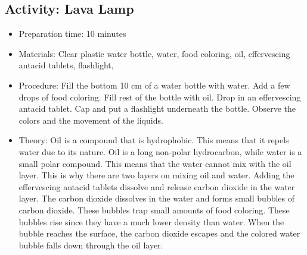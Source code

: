 \begin{itemize}
{\begin{itemize}
\begin{itemize}
{\subsection{Activity: Lava Lamp}
\begin{itemize}
\item{Preparation time: 10 minutes}
\item{Materials: Clear plastic water bottle, water, food coloring, oil, effervescing antacid tablets, flashlight,}
\item{Procedure: Fill the bottom 10 cm of a water bottle with water. Add a few drops of food coloring. Fill rest of the bottle with oil. Drop in an effervescing antacid tablet. Cap and put a flashlight underneath the bottle. Observe the colors and the movement of the liquids.}
\item{Theory: Oil is a compound that is hydrophobic. This means that it repels water due to its nature. Oil is a long non-polar hydrocarbon, while water is a small polar compound. This means that the water cannot mix with the oil layer. This is why there are two layers on mixing oil and water. Adding the effervescing antacid tablets dissolve and release carbon dioxide in the water layer. The carbon dioxide dissolves in the water and forms small bubbles of carbon dioxide. These bubbles trap small amounts of food coloring. These bubbles rise since they have a much lower density than water. When the bubble reaches the surface, the carbon dioxide escapes and the colored water bubble falls down through the oil layer.}
\end{itemize}

}
\end{itemize}
\end{itemize}}
\end{itemize}
